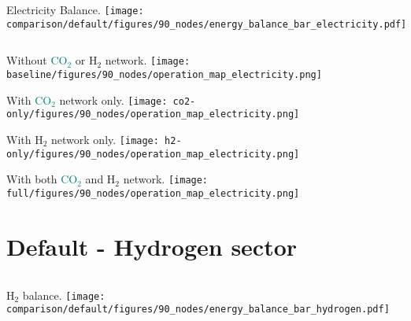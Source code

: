 \documentclass[12pt, aspectratio=169]{beamer}
\newcommand{\carbon}{\textcolor{teal}{CO$_2$}}
\newcommand{\hydrogen}{H$_2$}
\begin{document}
\begin{frame}
    \begin{columns}
        Electricity Balance.
        \texttt{[image: comparison/default/figures/90\_nodes/energy\_balance\_bar\_electricity.pdf]}
    \end{columns}
\end{frame}

\begin{frame}
    \begin{center}
    Without \carbon{} or \hydrogen{} network.
    \texttt{[image: baseline/figures/90\_nodes/operation\_map\_electricity.png]}
    \end{center}
\end{frame}


\begin{frame}
    \begin{center}
    With \carbon{} network only.
    \texttt{[image: co2-only/figures/90\_nodes/operation\_map\_electricity.png]}
    \end{center}
\end{frame}

\begin{frame}
    \begin{center}
    With \hydrogen{} network only.
    \texttt{[image: h2-only/figures/90\_nodes/operation\_map\_electricity.png]}
    \end{center}
\end{frame}

\begin{frame}
    \begin{center}
    With both \carbon{}  and \hydrogen{} network.
    \texttt{[image: full/figures/90\_nodes/operation\_map\_electricity.png]}
    \end{center}
\end{frame}

\section*{Default - Hydrogen sector}

\begin{frame}
    \begin{columns}
        \hydrogen{} balance.
        \texttt{[image: comparison/default/figures/90\_nodes/energy\_balance\_bar\_hydrogen.pdf]}
    \end{columns}
\end{frame}
\end{document}
